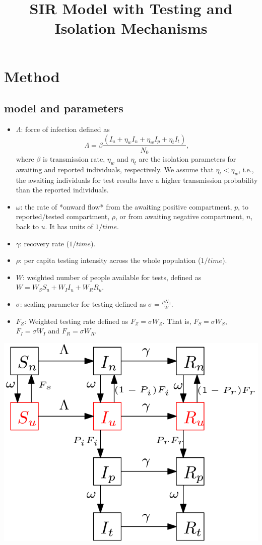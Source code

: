 \documentclass{article}\usepackage[]{graphicx}\usepackage[]{color}
\title{SIR Model with Testing and Isolation Mechanisms}
\begin{document}
\maketitle

\section{Method}

\subsection{model and parameters}
\begin{itemize}
\item $\Lambda$: force of infection defined as $$\Lambda=\beta \frac{(I_u+\eta_w I_n+\eta_w I_p+ \eta_t I_t)}{N_0},$$ where $\beta$ is transmission rate, $\eta_w$ and $\eta_t$ are the isolation parameters for awaiting and reported individuals, respectively. We assume that $\eta_t<\eta_w$, i.e., the awaiting individuals for test results have a higher transmission probability than the reported individuals.
\item $\omega$: the rate of *onward flow* from the awaiting positive compartment, $p$, to reported/tested compartment, $\rho$, or from awaiting negative compartment, $n$, back to $u$.  It has units of $1/time$.
\item $\gamma$: recovery rate ($1/time$).
\item $\rho$: per capita testing intensity across the whole population ($1/time$).
\item $W$: weighted number of people available for tests, defined as $W = W_S S_u + W_I I_u + W_R R_u$.
\item $\sigma$: scaling parameter for testing defined as $\sigma = \frac{\rho N_0}{W}$.
\item $F_Z$: Weighted testing rate defined as $F_Z=\sigma W_Z$. That is, $F_S = \sigma W_S$, $F_I=\sigma W_I$ and $F_R = \sigma W_R$.
\end{itemize}

\includegraphics[width=\linewidth]{../pix/sir_comp2.png}
\end{document}
